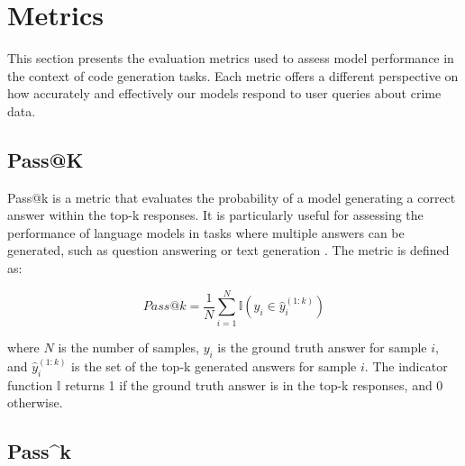 
\section{Metrics}

This section presents the evaluation metrics used to assess model performance in the context of code generation tasks. Each metric offers a different perspective on how accurately and effectively our models respond to user queries about crime data.

\subsection{Pass@K}

Pass@k is a metric that evaluates the probability of a model generating a correct answer within the top-k responses. It is particularly useful for assessing the performance of language models in tasks where multiple answers can be generated, such as question answering or text generation \citep{Levi2024SimpleModelInferenceScalingLaws}. The metric is defined as:

\begin{equation}
    Pass@k = \frac{1}{N} \sum_{i=1}^{N} \mathbb{I}(y_i \in \hat{y}_i^{(1:k)})
\end{equation}

where \(N\) is the number of samples, \(y_i\) is the ground truth answer for sample \(i\), and \(\hat{y}_i^{(1:k)}\) is the set of the top-k generated answers for sample \(i\). The indicator function \(\mathbb{I}\) returns 1 if the ground truth answer is in the top-k responses, and 0 otherwise.


\subsection{Pass\textasciicircum k}

